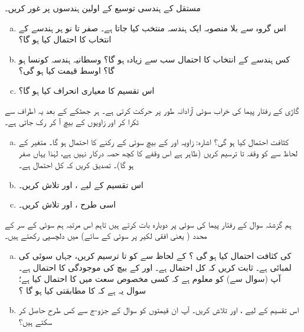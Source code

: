 مستقل  کے ہندسی توسیع کے اولین  ہندسوں  پر غور کریں۔
\begin{enumerate}[a.]
\item
اس گروہ سے بلا منصوبہ ایک ہندسہ منتخب کیا جاتا ہے۔ صفر تا نو ہر ہندسے کے انتخاب کا احتمال کیا ہو گا؟
\item
 کس ہندسے کے انتخاب کا احتمال سب سے زیادہ ہو گا؟ وسطانیہ ہندسہ کونسا ہو گا؟ اوسط قیمت کیا ہو گی؟
\item
اس تقسیم کا معیاری انحراف کیا ہو گا؟
\end{enumerate}
گاڑی کے رفتار پیما کی خراب سوئی آزادانہ طور پر حرکت کرتی ہے۔ ہر جھٹکے کے بعد یہ اطراف سے ٹکرا کر  اور  زاویوں کے بیچ آ کر رک جاتی ہے۔
\begin{enumerate}[a.] 
\item

کثافت احتمال  کیا ہو گی؟ اشارہ: زاویہ  اور  کے بیچ سوئی کے رکنے کا احتمال  ہو گا۔ متغیر  کے لحاظ سے  کو وقفہ تا  ترسیم کریں (ظاہر ہے اس وقفے کا کچھ حصہ درکار نہیں ہے، لہٰذا  یہاں صفر ہو گا)۔ تصدیق کریں کہ کل احتمال  ہے۔
\item
اس تقسیم کے لیے ،  اور  تلاش کریں۔
\item
 اسی طرح ،  اور  تلاش کریں۔
\end{enumerate}
 ہم گزشتہ سوال کے رفتار پیما کی سوئی پر دوبارہ بات کرتے ہیں تاہم اس مرتبہ ہم سوئی کے سر کے  محدد ( یعنی افقی لکیر پر سوئی کے سائے) میں دلچسپی رکھتے ہیں۔
\begin{enumerate}[a.]
\item 
  کی کثافت احتمال کیا ہو گی ؟  کے لحاظ سے  کو  تا  ترسیم کریں، جہاں  سوئی کی لمبائی ہے۔ ثابت کریں کہ کل احتمال  ہے۔   اور  کے بیچ  کی موجودگی کا احتمال  ہے۔ آپ (سوال  سے) کو معلوم ہے کہ کسی مخصوص سعت میں  کا احتمال کیا ہے؛ سوال یہ ہے کہ  کا مطابقتی  کیا ہو گا ؟
\item
 اس تقسیم کے لیے ،  اور  تلاش کریں۔ آپ ان قیمتوں کو سوال  کے جزو-ج سے کس طرح حاصل کر سکتے ہیں؟
 \end{enumerate}

